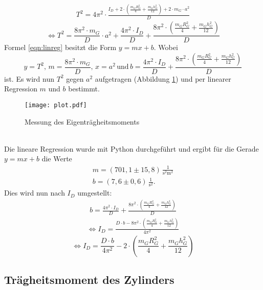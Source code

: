 \begin{align*}
  T^2 = 4\pi^2 \cdot \frac{I_D + 2 \cdot \left(\frac{m_G R_G^2}{4} + \frac{m_G h_G^2}{12} \right) + 2 \cdot m_G \cdot a^2}{D}
\end{align*}
\begin{equation}
  \label{eqn:linreg}
  \Leftrightarrow T^2 = \frac{8\pi^2 \cdot m_G}{D}\cdot a^2 + \frac{4\pi^2 \cdot I_D}{D}  + \frac{8\pi^2 \cdot \left(\frac{m_G R_G^2}{4} + \frac{m_G h_G^2}{12} \right)}{D}
\end{equation}
Formel \ref{eqn:linreg} besitzt die Form $y = mx + b$. Wobei 
\begin{equation*}
  y = T^2,\, m = \frac{8\pi^2 \cdot m_G}{D},\, x = a^2 \, \mathrm{und}\, b = \frac{4\pi^2 \cdot I_D}{D}  + \frac{8\pi^2 \cdot \left(\frac{m_G R_G^2}{4} + \frac{m_G h_G^2}{12} \right)}{D}
\end{equation*}
ist. Es wird nun $T^2$ gegen $a^2$ aufgetragen (Abbildung \ref{fig:plot}) und per linearer Regression $m$ und $b$ bestimmt.
 \begin{figure}
   \centering
   \texttt{[image: plot.pdf]}
   \caption{Messung des Eigenträgheitsmoments}
   \label{fig:plot}
 \end{figure}
\\
Die lineare Regression wurde mit Python durchgeführt und ergibt für die Gerade $y = mx + b$ die Werte
\begin{align*}
  m = (701{,}1 \pm 15{,}8)\, \frac{1}{\mathrm{s^2 m^2}} \\
  b = (7{,}6 \pm 0{,}6)\, \frac{1}{\mathrm{s^2}} .
\end{align*}
Dies wird nun nach $I_D$ umgestellt:
\begin{align*}
  b = \frac{4\pi^2 \cdot I_D}{D}  + \frac{8\pi^2 \cdot \left(\frac{m_G R_G^2}{4} + \frac{m_G h_G^2}{12} \right)}{D}
\end{align*}
\begin{align*}
  \Leftrightarrow I_D = \frac{D \cdot b - 8\pi^2 \cdot \left(\frac{m_G R_G^2}{4} + \frac{m_G h_G^2}{12} \right)}{4\pi^2}
\end{align*}
\begin{equation}
  \Leftrightarrow I_D = \frac{D \cdot b}{4\pi^2} - 2 \cdot \left(\frac{m_G R_G^2}{4} + \frac{m_G h_G^2}{12} \right)
\end{equation}

\subsection{Trägheitsmoment des Zylinders}
\label{sec:TraegheitsmomentdesZylinders}
